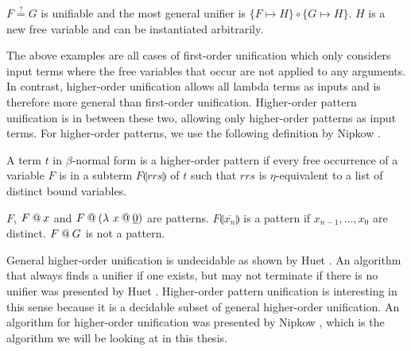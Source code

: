 \begin{example}
	$F \overset{?}{=} G$ is unifiable and the most general unifier is $\{F \mapsto H\} \circ \{G \mapsto H\}$. $H$ is a new free variable and can be instantiated arbitrarily.
\end{example}

The above examples are all cases of first-order unification which only considers input terms where the free variables that occur are not applied to any arguments. In contrast, higher-order unification allows all lambda terms as inputs and is therefore more general than first-order unification. Higher-order pattern unification is in between these two, allowing only higher-order patterns as input terms. For higher-order patterns, we use the following definition by Nipkow \cite{Nipkow-LICS-93}.

\begin{definition}
	A term $t$ in $\beta$-normal form is a higher-order pattern if every free occurrence of a variable $F$ is in a subterm $F \llparenthesis rrs \rrparenthesis$ of $t$ such that $rrs$ is $\eta$-equivalent to a list of distinct bound variables.
\end{definition}

\begin{example}
	$F$, $F \mathbin{@} x$ and $F \mathbin{@} \left( \lambda \ x \mathbin{@} \underline{0} \right)$ are patterns. $F \llparenthesis \overline{x_n} \rrparenthesis$ is a pattern if $x_{n - 1}, \dots, x_0$ are distinct. $F \mathbin{@} G$ is not a pattern.
\end{example}

General higher-order unification is undecidable as shown by Huet \cite{Huet_1973}. An algorithm that always finds a unifier if one exists, but may not terminate if there is no unifier was presented by Huet \cite{HUET197527}. Higher-order pattern unification is interesting in this sense because it is a decidable subset of general higher-order unification. An algorithm for higher-order unification was presented by Nipkow \cite{Nipkow-LICS-93}, which is the algorithm we will be looking at in this thesis.